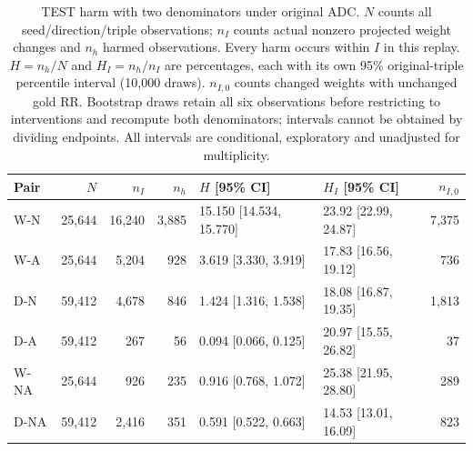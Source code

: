\begin{table}[htbp]
\centering\footnotesize\setlength{\tabcolsep}{3pt}
\caption{TEST harm with two denominators under original ADC. $N$ counts all seed/direction/triple observations; $n_I$ counts actual nonzero projected weight changes and $n_h$ harmed observations. Every harm occurs within $I$ in this replay. $H=n_h/N$ and $H_I=n_h/n_I$ are percentages, each with its own 95\% original-triple percentile interval (10,000 draws). $n_{I,0}$ counts changed weights with unchanged gold RR. Bootstrap draws retain all six observations before restricting to interventions and recompute both denominators; intervals cannot be obtained by dividing endpoints. All intervals are conditional, exploratory and unadjusted for multiplicity.}
\label{tab:outcome-harm-test}
\begin{tabular}{lrrrllr}
\toprule
Pair & $N$ & $n_I$ & $n_h$ & $H$ [95\% CI] & $H_I$ [95\% CI] & $n_{I,0}$\\
\midrule
W-N & 25,644 & 16,240 & 3,885 & 15.150 [14.534, 15.770] & 23.92 [22.99, 24.87] & 7,375\\
W-A & 25,644 & 5,204 & 928 & 3.619 [3.330, 3.919] & 17.83 [16.56, 19.12] & 736\\
D-N & 59,412 & 4,678 & 846 & 1.424 [1.316, 1.538] & 18.08 [16.87, 19.35] & 1,813\\
D-A & 59,412 & 267 & 56 & 0.094 [0.066, 0.125] & 20.97 [15.55, 26.82] & 37\\
W-NA & 25,644 & 926 & 235 & 0.916 [0.768, 1.072] & 25.38 [21.95, 28.80] & 289\\
D-NA & 59,412 & 2,416 & 351 & 0.591 [0.522, 0.663] & 14.53 [13.01, 16.09] & 823\\
\bottomrule
\end{tabular}
\end{table}
